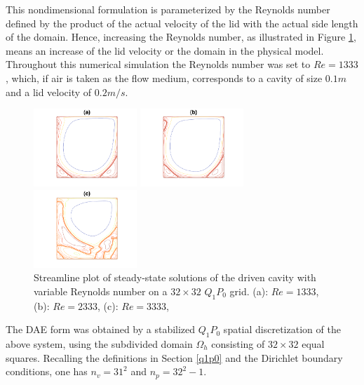 \documentclass[a4paper,10pt,BCOR=15mm]{scrbook}
\begin{document}
This nondimensional formulation is parameterized by the Reynolds number defined by the product of the actual velocity of the lid with the actual side length of the domain. Hence, increasing the Reynolds number, as illustrated in Figure \ref{drivcavre}, means an increase of the lid velocity or the domain in the physical model. Throughout this numerical simulation the Reynolds number was set to $Re = 1333$, which, if air is taken as the flow medium, corresponds to a cavity of size $0.1m$ and a lid velocity of $0.2 m/s$. 

\begin{figure}[htbp]
  \centering
  \begin{minipage}[b]{3.9 cm}
    \includegraphics[width=3.9cm]{pics/numex/drivcavRe1333.pdf}  
  \end{minipage}
  \begin{minipage}[b]{3.9 cm}
    \includegraphics[width=3.9cm]{pics/numex/drivcavRe2333s.pdf}  
  \end{minipage}
  \begin{minipage}[b]{3.9 cm}
    \includegraphics[width=3.9cm]{pics/numex/drivcavRe3333.pdf}  
  \end{minipage}
  \caption{Streamline plot of steady-state solutions of the driven cavity with variable Reynolds number on a $32\times32$ $Q_1P_0$ grid. (a): $Re = 1333$, (b): $Re = 2333$, (c): $Re = 3333$,}
  \label{drivcavre}
\end{figure}

The DAE form was obtained by a stabilized $Q_1P_0$ spatial discretization of the above system, using the subdivided domain $\Omega_h$ consisting of $32 \times 32$ equal squares. Recalling the definitions in Section \ref{q1p0} and the Dirichlet boundary conditions, one has $n_v=31^2$ and $n_p = 32^2-1$. 
\end{document}
